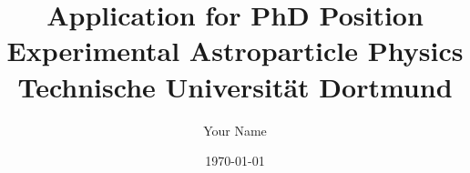 \documentclass[a4paper, 12pt]{article}
\begin{document}
\title{Application for PhD Position \\  Experimental Astroparticle Physics \\ Technische Universit\"at Dortmund}
\author{Your Name}
\date{\today}
\maketitle

\newpage
\tableofcontents  

\newpage 


\end{document}
